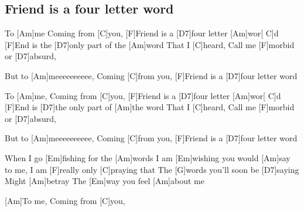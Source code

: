 \subsection*{Friend is a four letter word   }
\begin{guitar}



To [Am]me
Coming from [C]you,
[F]Friend is a [D7]four letter [Am]wor[  C]d
[F]End is the [D7]only part of the [Am]word
That I [C]heard,
Call me [F]morbid or [D7]absurd,



But to [Am]meeeeeeeeee,
Coming [C]from you,
[F]Friend is a [D7]four letter word






To [Am]me,
Coming from [C]you,
[F]Friend is a [D7]four letter [Am]wor[   C]d
[F]End is [D7]the only part of [Am]the word
That I [C]heard,
Call me [F]morbid or [D7]absurd,



But to [Am]meeeeeeeeee,
Coming [C]from you,
[F]Friend is a [D7]four letter word



When I go [Em]fishing
for the [Am]words
I am [Em]wishing you would [Am]say to me,
I am [F]really only [C]praying that
The [G]words you'll soon be [D7]saying
Might [Am]betray
The [Em]way you feel [Am]about me



[Am]To me,
Coming from [C]you,

\end{guitar}

